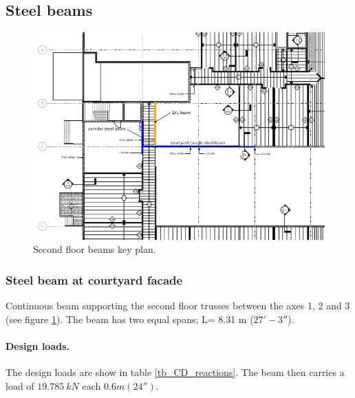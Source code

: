 \subsection{Steel beams}

\begin{figure}
  \begin{center}
  \includegraphics[width=120mm]{figures/steel_beams_key_plan}
  \end{center}
  \caption{Second floor beams key plan.}\label{fg_2nd_floor_beams_key_plan}
\end{figure}

\subsubsection{Steel beam at courtyard facade}
Continuous beam supporting the second floor trusses between the axes 1, 2 and 3 (see figure \ref{fg_2nd_floor_beams_key_plan}). The beam has two equal spans; L= 8.31 m ($27' - 3''$).

\paragraph{Design loads.}
The design loads are show in table \ref{tb_CD_reactions}. The beam then carries a load of $19.785\ kN$ each $0.6 m (24'')$. 

